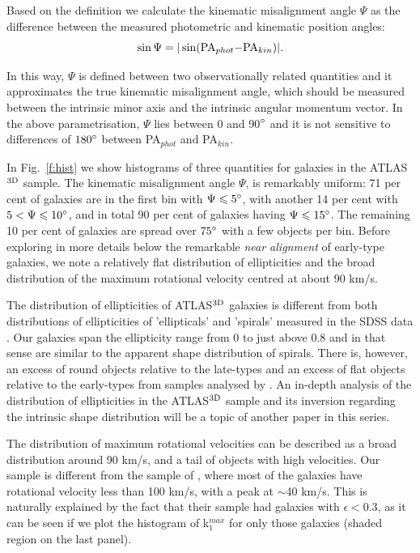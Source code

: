 \documentclass[usenatbib,usegraphicx]{mn2e}
\begin{document}
Based on the \citet{1991ApJ...383..112F} definition we calculate the kinematic misalignment angle $\Psi$ as the difference between the measured photometric and kinematic position angles:
%
\begin{equation}
%
\sin \Psi = | \sin ($PA$_{phot} - $PA$_{kin})|.
%
\end{equation}

\noindent In this way, $\Psi$ is defined between two observationally related quantities and it approximates the true kinematic misalignment angle, which should be measured between the intrinsic minor axis and the intrinsic angular momentum vector.  In the above parametrisation, $\Psi$ lies between 0 and 90$\hbox{$^\circ$}$ and it is not sensitive to differences of $180\hbox{$^\circ$}$ between PA$_{phot}$ and PA$_{kin}$. 

In Fig.~\ref{f:hist} we show histograms of three quantities for galaxies in the ATLAS$^{\rm 3D}$ sample. The kinematic misalignment angle $\Psi$, is remarkably uniform: 71 per cent of galaxies are in the first bin with $\Psi \leqslant 5\hbox{$^\circ$}$, with another 14 per cent with $5 < \Psi \leqslant 10\hbox{$^\circ$}$, and in total 90 per cent of galaxies having $\Psi \leqslant 15\hbox{$^\circ$}$. The remaining 10 per cent of galaxies are spread over $75\hbox{$^\circ$}$ with a few objects per bin. Before exploring in more details below the remarkable {\it near alignment} of early-type galaxies, we note a relatively flat distribution of ellipticities and the broad distribution of the maximum rotational velocity centred at about 90 km/s. 

The distribution of ellipticities of ATLAS$^{\rm 3D}$ galaxies is different from both distributions of ellipticities of 'ellipticals' and 'spirals' measured in the SDSS data \citep{2008MNRAS.388.1321P}. Our galaxies span the ellipticity range from 0 to just above 0.8 and in that sense are similar to the apparent shape distribution of spirals. There is, however, an excess of round objects relative to the late-types and an excess of flat objects relative to the early-types from samples analysed by \citet{2008MNRAS.388.1321P}. An in-depth analysis of the distribution of ellipticities in the ATLAS$^{\rm 3D}$ sample and its inversion regarding the intrinsic shape distribution will be a topic of another paper in this series.

The distribution of maximum rotational velocities can be described as a broad distribution around 90 km/s, and a tail of objects with high velocities. Our sample is different from the sample of \citet{1991ApJ...383..112F}, where most of the galaxies have rotational velocity less than 100 km/s, with a peak at $\sim$40 km/s. This is naturally explained by the fact that their sample had galaxies with $\epsilon<0.3$, as it can be seen if we plot the histogram of k$_1^{max}$ for only those galaxies (shaded region on the last panel). 
\end{document}
